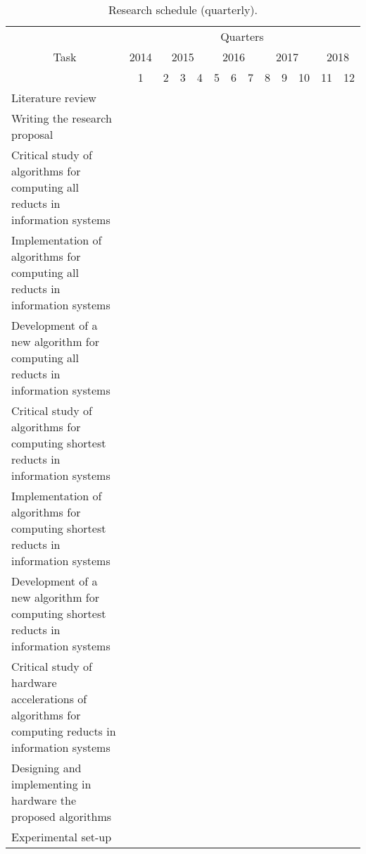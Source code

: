 \documentclass[authoryear,11pt]{elsarticle}
\begin{document}
  
 \begin{table}[h!]
		\caption{Research schedule (quarterly\protect\footnotemark).} \label{tab_Schedule}
		\centering
 	\begin{tabular}{|p{7cm}|c|c|c|c|c|c|c|c|c|c|c|c|}
 		\hline
		\multicolumn{1}{|c|}{\multirow{3}{*}{Task}} & \multicolumn{12}{c|}{Quarters}\\
 		\cline{2-13}
		 & 2014 & \multicolumn{3}{c|}{2015} & \multicolumn{3}{c|}{2016} & \multicolumn{3}{c|}{2017}
		 & \multicolumn{2}{c|}{2018} \\
 		\cline{2-13}
		 & 1 & 2 & 3 & 4 & 5 & 6 & 7 & 8 & 9 & 10 & 11 & 12 \\
		\hline
		Literature review &\cellcolor{blue}&\cellcolor{blue}&\cellcolor{blue}&
		\cellcolor{blue}&\cellcolor{blue}&\cellcolor{blue}&\cellcolor{blue}&
		\cellcolor{blue}&\cellcolor{blue}&\cellcolor[gray]{0.9}&\cellcolor[gray]{0.9}&
		\cellcolor[gray]{0.9}\\
		\hline
		Writing the research proposal &\cellcolor{blue}&\cellcolor{blue}&\cellcolor{blue}&&&&&&&&&\\
		\hline
		Critical study of algorithms for computing all reducts in information systems
		&\cellcolor{blue}&\cellcolor{blue}&\cellcolor{blue}&&&&&&&&&\\
		\hline
		Implementation of algorithms for computing all reducts in information systems
		&&\cellcolor{blue}&\cellcolor{blue}&&&&&&&&&\\
		\hline
		Development of a new algorithm for computing all reducts in information systems
		&&&&\cellcolor{blue}&&&&&&&&\\
		\hline
		Critical study of algorithms for computing shortest reducts in information systems
		&&&&\cellcolor{blue}&&\cellcolor{blue}&\cellcolor{blue}&\cellcolor{blue}&&&&\\
		\hline
		Implementation of algorithms for computing shortest reducts in information systems
		&&&&&&&\cellcolor{blue}&\cellcolor{blue}&&&&\\
		\hline
		Development of a new algorithm for computing shortest reducts in information systems
		&&&&&&&&\cellcolor{blue}&&&&\\
		\hline
		Critical study of hardware accelerations of algorithms for computing reducts in information systems
		&&&&&&&&&\cellcolor{blue}&\cellcolor[gray]{0.9}&&\\
		\hline
		Designing and implementing in hardware the proposed algorithms
		&&&&&&&&&&\cellcolor[gray]{0.9}&&\\
		\hline
		Experimental set-up &\cellcolor{blue}&\cellcolor{blue}&&\cellcolor{blue}&

\end{tabular}
\end{table}
\end{document}
